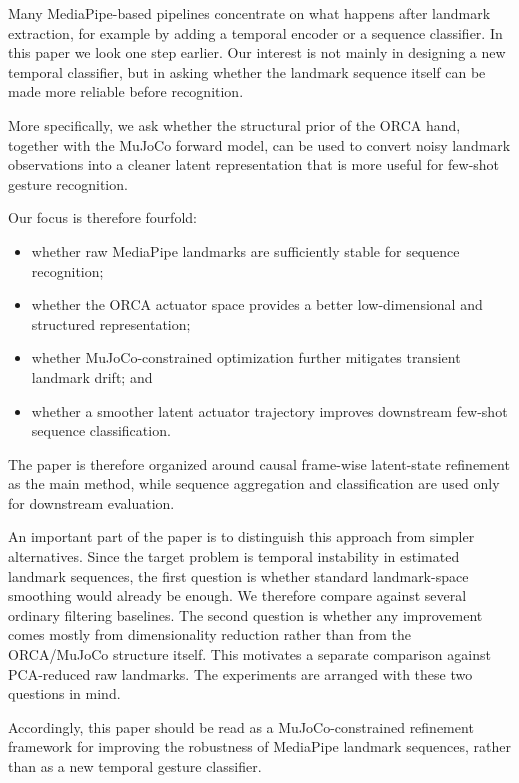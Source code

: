 \documentclass[11pt]{article}
\begin{document}
Many MediaPipe-based pipelines concentrate on what happens after landmark extraction, for example by adding a temporal encoder or a sequence classifier. In this paper we look one step earlier. Our interest is not mainly in designing a new temporal classifier, but in asking whether the landmark sequence itself can be made more reliable before recognition.

More specifically, we ask whether the structural prior of the ORCA hand, together with the MuJoCo forward model, can be used to convert noisy landmark observations into a cleaner latent representation that is more useful for few-shot gesture recognition.

Our focus is therefore fourfold:
\begin{itemize}[leftmargin=*]
    \item whether raw MediaPipe landmarks are sufficiently stable for sequence recognition;
    \item whether the ORCA actuator space provides a better low-dimensional and structured representation;
    \item whether MuJoCo-constrained optimization further mitigates transient landmark drift; and
    \item whether a smoother latent actuator trajectory improves downstream few-shot sequence classification.
\end{itemize}

The paper is therefore organized around causal frame-wise latent-state refinement as the main method, while sequence aggregation and classification are used only for downstream evaluation.

An important part of the paper is to distinguish this approach from simpler alternatives. Since the target problem is temporal instability in estimated landmark sequences, the first question is whether standard landmark-space smoothing would already be enough. We therefore compare against several ordinary filtering baselines. The second question is whether any improvement comes mostly from dimensionality reduction rather than from the ORCA/MuJoCo structure itself. This motivates a separate comparison against PCA-reduced raw landmarks. The experiments are arranged with these two questions in mind.

Accordingly, this paper should be read as a MuJoCo-constrained refinement framework for improving the robustness of MediaPipe landmark sequences, rather than as a new temporal gesture classifier.
\end{document}
